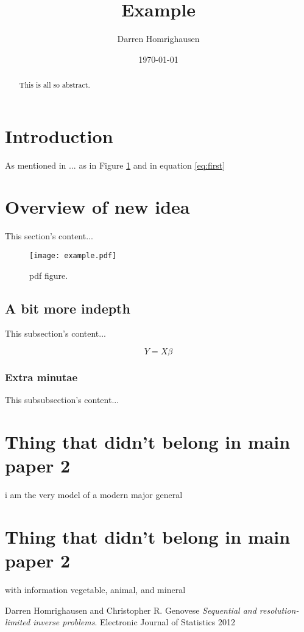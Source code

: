 \documentclass{article}
\begin{document}
\title{Example}
\author{Darren Homrighausen}
\date{\today}
\maketitle

\begin{abstract}
This is all so abstract.
\end{abstract}

\section{Introduction}
As mentioned in \cite[p.g. 124]{homrighausen2012}...
as in Figure \ref{fig:greenRed} and in equation \ref{eq:first}
\section{Overview of new idea}
This section's content...

\begin{figure}[h!]
  \centering
  \texttt{[image: example.pdf]}
  \caption{pdf figure.}
  \label{fig:greenRed}
\end{figure}


\subsection{A bit more indepth}
This subsection's content...

\begin{equation}
Y = X\beta
\label{eq:first}
\end{equation}
\subsubsection{Extra minutae}
This subsubsection's content...

\appendix

\section{Thing that didn't belong in main paper 2}
i am the very model of a modern major general
\section{Thing that didn't belong in main paper 2}
with information vegetable, animal, and mineral

\begin{thebibliography}{9}

  Darren Homrighausen and Christopher R. Genovese
  \emph{Sequential and resolution-limited inverse problems}.
  Electronic Journal of Statistics
  2012

\end{thebibliography}
\end{document}
